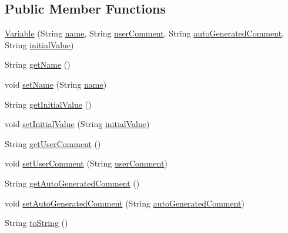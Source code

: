 \subsection*{Public Member Functions}
\begin{DoxyCompactItemize}
\item 
\hyperlink{classit_1_1isislab_1_1masonhelperdocumentation_1_1_o_d_d_1_1_variable_ae6b85864343cc5ac3ae6c65395f7c7df}{Variable} (String \hyperlink{classit_1_1isislab_1_1masonhelperdocumentation_1_1_o_d_d_1_1_variable_acf7d0255e957f01bd74e72a81209d3ad}{name}, String \hyperlink{classit_1_1isislab_1_1masonhelperdocumentation_1_1_o_d_d_1_1_variable_abc4f019f82f47614b2b62743799dc7b5}{user\-Comment}, String \hyperlink{classit_1_1isislab_1_1masonhelperdocumentation_1_1_o_d_d_1_1_variable_a66bdb6cd067ee33adcd4556f5b672f23}{auto\-Generated\-Comment}, String \hyperlink{classit_1_1isislab_1_1masonhelperdocumentation_1_1_o_d_d_1_1_variable_abf11129fa15afb4375d1e040728de05d}{initial\-Value})
\item 
String \hyperlink{classit_1_1isislab_1_1masonhelperdocumentation_1_1_o_d_d_1_1_variable_a15779a85c81c7b194819649cfa125008}{get\-Name} ()
\item 
void \hyperlink{classit_1_1isislab_1_1masonhelperdocumentation_1_1_o_d_d_1_1_variable_ad5c66ce18d66e658f3fb70f341d3476f}{set\-Name} (String \hyperlink{classit_1_1isislab_1_1masonhelperdocumentation_1_1_o_d_d_1_1_variable_acf7d0255e957f01bd74e72a81209d3ad}{name})
\item 
String \hyperlink{classit_1_1isislab_1_1masonhelperdocumentation_1_1_o_d_d_1_1_variable_a340728b74ab3f3b784dbb85dde0e82e6}{get\-Initial\-Value} ()
\item 
void \hyperlink{classit_1_1isislab_1_1masonhelperdocumentation_1_1_o_d_d_1_1_variable_a350c168d7abd9d602d912dee3bb6bb51}{set\-Initial\-Value} (String \hyperlink{classit_1_1isislab_1_1masonhelperdocumentation_1_1_o_d_d_1_1_variable_abf11129fa15afb4375d1e040728de05d}{initial\-Value})
\item 
String \hyperlink{classit_1_1isislab_1_1masonhelperdocumentation_1_1_o_d_d_1_1_variable_abe1cf0930d61cafe6d0800eb6b43eaf3}{get\-User\-Comment} ()
\item 
void \hyperlink{classit_1_1isislab_1_1masonhelperdocumentation_1_1_o_d_d_1_1_variable_adb16810a23c26422f158468a7581d804}{set\-User\-Comment} (String \hyperlink{classit_1_1isislab_1_1masonhelperdocumentation_1_1_o_d_d_1_1_variable_abc4f019f82f47614b2b62743799dc7b5}{user\-Comment})
\item 
String \hyperlink{classit_1_1isislab_1_1masonhelperdocumentation_1_1_o_d_d_1_1_variable_a6785690c05bc7616e7737e2e5f9b3bec}{get\-Auto\-Generated\-Comment} ()
\item 
void \hyperlink{classit_1_1isislab_1_1masonhelperdocumentation_1_1_o_d_d_1_1_variable_ae38edd4c061e538f472e655dd71d7e5f}{set\-Auto\-Generated\-Comment} (String \hyperlink{classit_1_1isislab_1_1masonhelperdocumentation_1_1_o_d_d_1_1_variable_a66bdb6cd067ee33adcd4556f5b672f23}{auto\-Generated\-Comment})
\item 
String \hyperlink{classit_1_1isislab_1_1masonhelperdocumentation_1_1_o_d_d_1_1_variable_a18f7df964c33c3cb6663efb3b6cf8dee}{to\-String} ()
\end{DoxyCompactItemize}
